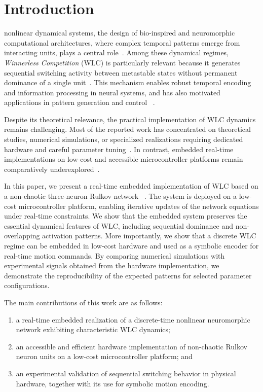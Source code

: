 \documentclass[lettersize,journal]{IEEEtran}
\begin{document}
\section{Introduction}
 nonlinear dynamical systems, the design of bio-inspired and neuromorphic computational architectures, where complex temporal patterns emerge from interacting units, plays a central role~\cite{hopfield1982,maass2002real,rabinovich2006dynamical}. Among these dynamical regimes, \textit{Winnerless Competition} (WLC) is particularly relevant because it generates sequential switching activity between metastable states without permanent dominance of a single unit~\cite{rabinovich2001dynamical,afraimovich2004heteroclinic,rabinovich2008transient}. This mechanism enables robust temporal encoding and information processing in neural systems, and has also motivated applications in pattern generation and control ~\cite{seliger2003dynamics,rabinovich2012information,NevesTimme2012,varona2002winnerless}.

Despite its theoretical relevance, the practical implementation of WLC dynamics remains challenging. Most of the reported work has concentrated on theoretical studies, numerical simulations, or specialized realizations requiring dedicated hardware and careful parameter tuning~\cite{rabinovich2001dynamical,arena2009winnerless,caluwaerts2013tensegripede}. In contrast, embedded real-time implementations on low-cost and accessible microcontroller platforms remain comparatively underexplored~\cite{arduino2024}.

In this paper, we present a real-time embedded implementation of WLC based on a non-chaotic three-neuron Rulkov network ~\cite{rulkov2002modeling,Casado2004MPLB,ibarz2011map}. The system is deployed on a low-cost microcontroller platform, enabling iterative updates of the network equations under real-time constraints. We show that the embedded system preserves the essential dynamical features of WLC, including sequential dominance and non-overlapping activation patterns. More importantly, we show that a discrete WLC regime can be embedded in low-cost hardware and used as a symbolic encoder for real-time motion commands. By comparing numerical simulations with experimental signals obtained from the hardware implementation, we demonstrate the reproducibility of the expected patterns for selected parameter configurations.

The main contributions of this work are as follows:
\begin{enumerate}
    \item a real-time embedded realization of a discrete-time nonlinear neuromorphic network exhibiting characteristic WLC dynamics;
    \item an accessible and efficient hardware implementation of non-chaotic Rulkov neuron units on a low-cost microcontroller platform; and
    \item an experimental validation of sequential switching behavior in physical hardware, together with its use for symbolic motion encoding.
\end{enumerate}
\end{document}
